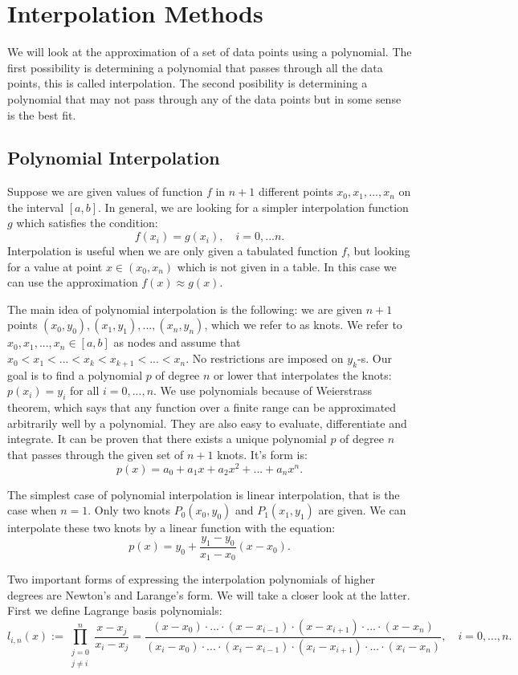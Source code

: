 \documentclass[a4paper,10pt]{article}
\begin{document}
\section{Interpolation Methods}
We will look at the approximation of a set of data points using a polynomial. The first possibility is determining a polynomial that passes through all the data points, this is called interpolation. The second posibility is determining a polynomial that may not pass through any of the data points but in some sense is the best fit. \cite{Woodford}
\subsection{Polynomial Interpolation}

Suppose we are given values of function $f$ in $n+1$ different points $x_0, x_1,...,x_n$ on the interval $[a,b]$. In general, we are looking for a simpler interpolation function $g$ which satisfies the condition: $$f(x_i)=g(x_i), \quad i=0,...n.$$ Interpolation is useful when we are only given a tabulated function $f$, but looking for a value at point $x \in (x_0,x_n)$ which is not given in a table. In this case we can use the approximation $f(x) \approx g(x)$.

The main idea of polynomial interpolation is the following: we are given $n+1$ points $(x_0,y_0), (x_1,y_1),...,(x_n,y_n)$, which we refer to as knots. We refer to $x_0, x_1,...,x_n \in [a,b]$ as nodes and assume that $x_0<x_1<...<x_k<x_{k+1}<...<x_n$. No restrictions are imposed on $y_k$-s. Our goal is to find a polynomial $p$ of degree $n$ or lower that interpolates the knots: $p(x_i)=y_i$ for all $i=0,...,n$. We use polynomials because of Weierstrass theorem, which says that any function over a finite range can be approximated arbitrarily well by a polynomial. They are also easy to evaluate, differentiate and integrate. It can be proven that there exists a unique polynomial $p$ of degree $n$ that passes through the given set of $n+1$ knots. It's form is: $$p(x)=a_0+a_1x+a_2x^2+...+a_nx^n.$$ \cite{Woodford}

The simplest case of polynomial interpolation is linear interpolation, that is the case when $n=1$. Only two knots  $P_0(x_0,y_0)$ and $P_1(x_1,y_1)$ are given. We can interpolate these two knots by a linear function with the equation: $$p(x)=y_0+\frac{y_1-y_0}{x_1-x_0}(x-x_0).$$

Two important forms of expressing the interpolation polynomials of higher degrees are Newton's and Larange's form. We will take a closer look at the latter. First we define Lagrange basis polynomials:
$$l_{i,n}(x):=\prod_{\substack{j=0 \\ j\neq i}}^{n}{\frac{x-x_j}{x_i-x_j}}=\frac{(x-x_0)\cdot...\cdot(x-x_{i-1})\cdot(x-x_{i+1})\cdot...\cdot(x-x_n)}{(x_i-x_0)\cdot...\cdot(x_i-x_{i-1})\cdot(x_i-x_{i+1})\cdot...\cdot(x_i-x_n)}, \quad i=0,...,n.$$ \cite{lagr}
\end{document}
